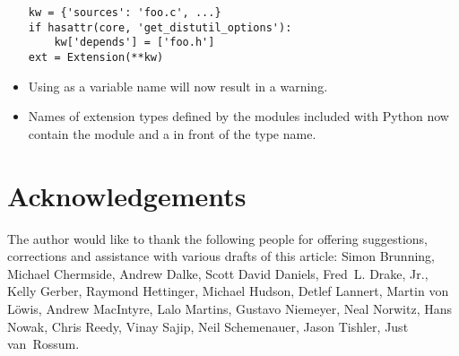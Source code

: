 \documentclass{howto}
\begin{document}
\begin{itemize}
\begin{verbatim}
kw = {'sources': 'foo.c', ...}
if hasattr(core, 'get_distutil_options'):
    kw['depends'] = ['foo.h']
ext = Extension(**kw)
\end{verbatim}

\item Using  as a variable name will now result in a
 warning.

\item Names of extension types defined by the modules included with
Python now contain the module and a  in front of the type
name.

\end{itemize}


\section{Acknowledgements \label{acks}}

The author would like to thank the following people for offering
suggestions, corrections and assistance with various drafts of this
article: Simon Brunning, Michael Chermside, Andrew Dalke, Scott David
Daniels, Fred~L. Drake, Jr., Kelly Gerber, Raymond Hettinger, Michael
Hudson, Detlef Lannert, Martin von L\"owis, Andrew MacIntyre, Lalo
Martins, Gustavo Niemeyer, Neal Norwitz, Hans Nowak, Chris Reedy,
Vinay Sajip, Neil Schemenauer, Jason Tishler, Just van~Rossum.
\end{document}
